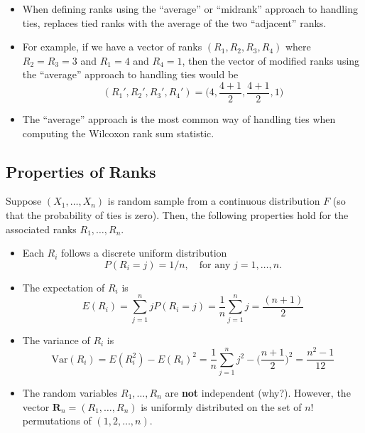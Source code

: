 \documentclass[]{book}
\providecommand{\tightlist}{%
  \setlength{\itemsep}{0pt}\setlength{\parskip}{0pt}}
\begin{document}
\begin{itemize}
\item
  When defining ranks using the ``average'' or ``midrank'' approach to handling ties, replaces
  tied ranks with the average of the two ``adjacent'' ranks.
\item
  For example, if we have a vector of ranks \((R_{1}, R_{2}, R_{3}, R_{4})\) where \(R_{2} = R_{3} =3\) and \(R_{1} = 4\) and \(R_{4} = 1\), then the vector of modified ranks using the ``average'' approach to handling ties
  would be
  \begin{equation}
  (R_{1}', R_{2}', R_{3}', R_{4}') = \Big( 4, \frac{4 + 1}{2}, \frac{4 + 1}{2}, 1 \Big)
  \end{equation}
\item
  The ``average'' approach is the most common way of handling ties when computing the
  Wilcoxon rank sum statistic.
\end{itemize}

\hypertarget{properties-of-ranks}{%
\subsection{Properties of Ranks}\label{properties-of-ranks}}

Suppose \((X_{1}, \ldots, X_{n})\) is random sample from a continuous distribution \(F\) (so that the probability
of ties is zero). Then, the following properties hold for the associated ranks \(R_{1}, \ldots, R_{n}\).

\begin{itemize}
\tightlist
\item
  Each \(R_{i}\) follows a discrete uniform distribution
  \begin{equation}
  P(R_{i} = j) = 1/n, \quad \text{for any } j = 1, \ldots,n.
  \end{equation}
\item
  The expectation of \(R_{i}\) is
  \begin{equation}
  E( R_{i} ) = \sum_{j=1}^{n} j P(R_{i} = j) = \frac{1}{n}\sum_{j=1}^{n} j = \frac{(n+1)}{2}
  \label{eq:rank-expectation}
  \end{equation}
\item
  The variance of \(R_{i}\) is
  \begin{equation}
  \text{Var}( R_{i} ) = E( R_{i}^{2} ) - E(R_{i})^{2}
  = \frac{1}{n}\sum_{j=1}^{n} j^{2}  - \Big( \frac{n+1}{2} \Big)^{2}
  = \frac{ n^{2} - 1}{12}
  \end{equation}
\item
  The random variables \(R_{1}, \ldots, R_{n}\) are \textbf{not} independent (why?). However,
  the vector \(\mathbf{R}_{n} = (R_{1}, \ldots, R_{n})\) is uniformly distributed
  on the set of \(n!\) permutations of \((1,2,\ldots,n)\).
\end{itemize}
\end{document}
